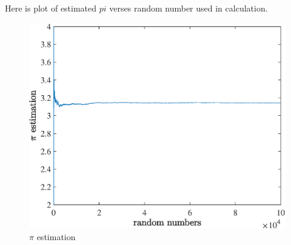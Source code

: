 Here is plot of estimated $pi$ verses random number used in calculation.

    \begin{figure}[H] 
	\caption{$\pi$ estimation} 
	\centering 
	\includegraphics[width=12cm]{../Figure/Bonus/mont_pi} 
\end{figure}